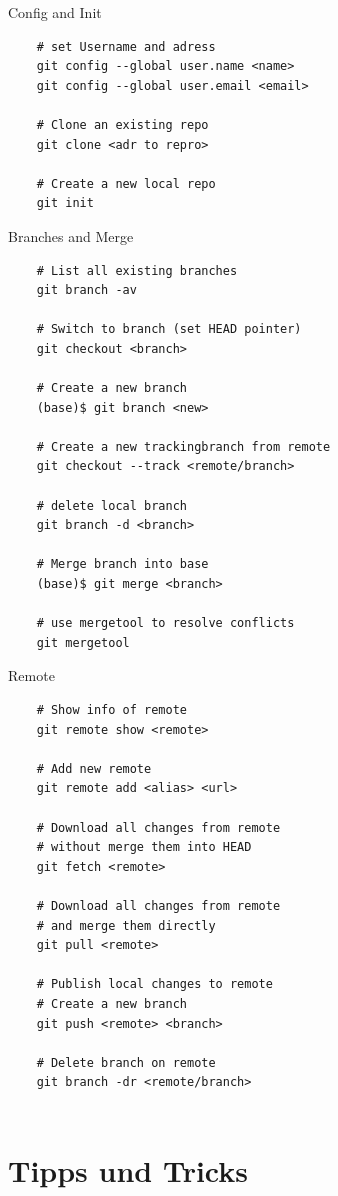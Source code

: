 \documentclass[
   draft=false
  ,paper=a4
  ,twoside=false
  ,fontsize=11pt
  ,headsepline
  ,DIV=11
  ,parskip=full+
  ,titlepage
]{scrartcl} %
\begin{document}
  \begin{minipage}[t]{0.45\linewidth}
  
    Config and Init
    \begin{lstlisting}
    # set Username and adress
    git config --global user.name <name>
    git config --global user.email <email>
    
    # Clone an existing repo
    git clone <adr to repro>
    
    # Create a new local repo
    git init
    \end{lstlisting}
    
    Branches and Merge
    \begin{lstlisting}
    # List all existing branches 
    git branch -av
    
    # Switch to branch (set HEAD pointer)
    git checkout <branch>
    
    # Create a new branch
    (base)$ git branch <new>
    
    # Create a new trackingbranch from remote
    git checkout --track <remote/branch>
    
    # delete local branch
    git branch -d <branch>
    
    # Merge branch into base
    (base)$ git merge <branch>
    
    # use mergetool to resolve conflicts
    git mergetool
    \end{lstlisting}
    Remote
    \begin{lstlisting}
    # Show info of remote
    git remote show <remote>
    
    # Add new remote
    git remote add <alias> <url>
    
    # Download all changes from remote 
    # without merge them into HEAD
    git fetch <remote>
    
    # Download all changes from remote
    # and merge them directly
    git pull <remote>
    
    # Publish local changes to remote
    # Create a new branch
    git push <remote> <branch>
    
    # Delete branch on remote
    git branch -dr <remote/branch> 
    
    \end{lstlisting}
    
  \end{minipage}%



\section{Tipps und Tricks}
\end{document}
